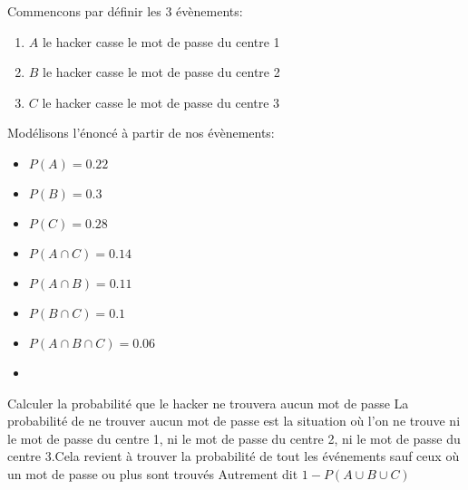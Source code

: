 \begin{exo}

    Commencons par définir les 3 évènements:
    \begin{enumerate}
        \item $A$ le hacker casse le mot de passe du centre 1
        \item $B$ le hacker casse le mot de passe du centre 2
        \item $C$ le hacker casse le mot de passe du centre 3
    \end{enumerate}
    Modélisons l'énoncé à partir de nos évènements:
    \begin{multicols}{2}
        \begin{itemize}
            \item $P(A) = 0.22$
            \item $P(B) = 0.3$
            \item $P(C) = 0.28$
            \item $P(A \cap C) = 0.14$
            \item $P(A \cap B) = 0.11$
            \item $P(B \cap C) = 0.1$
            \item $P(A\cap B \cap C) = 0.06$
            \item[\vspace{\fill}]
        \end{itemize}
    \end{multicols}
    \begin{subexo}{Calculer la probabilité que le hacker ne trouvera aucun mot de passe}
        La probabilité de ne trouver aucun mot de passe est la situation où l'on ne trouve ni le mot de passe du centre 1, ni le mot de passe du centre 2, ni le mot de passe du centre 3.Cela revient à trouver la probabilité de tout les événements sauf ceux où un mot de passe ou plus sont trouvés Autrement dit $1 - P(A\cup B \cup C)$
        \newline

\end{subexo}
\end{exo}

